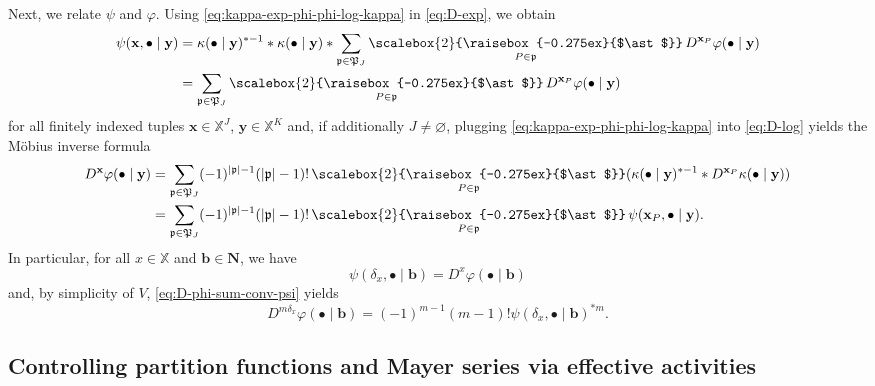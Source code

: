\documentclass[reqno, 11pt]{amsart}
\theoremstyle{definition}
\newcommand{\X}{\mathbb X}
\newcommand{\be}{\begin{equation}}
\newcommand{\ee}{\end{equation}}
\newcommand{\Conv}{\mathop{\scalebox{2}{\raisebox{-0.275ex}{$\ast$}}}}
\begin{document}
Next, we relate $\psi$ and $\varphi$. 
Using \eqref{eq:kappa-exp-phi-phi-log-kappa} in \eqref{eq:D-exp}, we obtain
\begin{align*}
	\psi(\mathbf x, \bullet \mid \mathbf y) & = \kappa(\bullet \mid \mathbf y)^{\ast -1} \ast \kappa(\bullet \mid \mathbf y) \ast \sum_{\mathfrak p \in \mathfrak P_J} \Conv_{P \in \mathfrak p} D^{\mathbf x_P} \varphi(\bullet \mid \mathbf y) \\
	& = \sum_{\mathfrak p \in \mathfrak P_J} \Conv_{P \in \mathfrak p} D^{\mathbf x_P} \varphi(\bullet \mid \mathbf y)
\end{align*}
for all finitely indexed tuples $\mathbf x \in \X^J$, $\mathbf y \in \X^K$ and, if additionally $J \neq \varnothing$, plugging \eqref{eq:kappa-exp-phi-phi-log-kappa} into \eqref{eq:D-log} yields the M{\"o}bius inverse formula
\begin{align}
	D^\mathbf x \varphi(\bullet \mid \mathbf y) & = \sum_{\mathfrak p \in \mathfrak P_J} (-1)^{|\mathfrak p| - 1} (|\mathfrak p| - 1)! \Conv_{P \in \mathfrak p} (\kappa(\bullet \mid \mathbf y)^{\ast -1} \ast D^{\mathbf x_P} \kappa(\bullet \mid \mathbf y)) \notag \\
	& = \sum_{\mathfrak p \in \mathfrak P_J} (-1)^{|\mathfrak p| - 1} (|\mathfrak p| - 1)! \Conv_{P \in \mathfrak p} \psi(\mathbf x_P, \bullet \mid \mathbf y). \label{eq:D-phi-sum-conv-psi}
\end{align}
In particular, for all $x \in \X$ and $\mathbf b \in \mathbf N$, we have
\be \label{eq:psi-x-D-x-phi}
	\psi(\delta_x, \bullet \mid \mathbf b) = D^x \varphi(\bullet \mid \mathbf b)
\ee
and, by simplicity of $V$, \eqref{eq:D-phi-sum-conv-psi} yields
\be \label{eq:D-phi-hard-core-clique}
	D^{m\delta_x} \varphi(\bullet \mid \mathbf b) = (-1)^{m-1} (m-1)! \psi(\delta_x, \bullet \mid \mathbf b)^{\ast m}.
\ee

\subsection{Controlling partition functions and Mayer series via effective activities}
\end{document}
